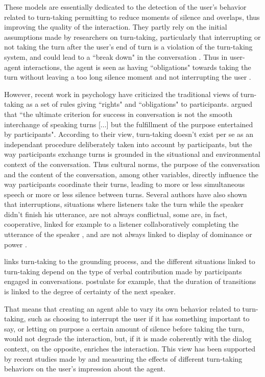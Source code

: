 These models are essentially dedicated to the detection of the user's behavior related to turn-taking permitting to reduce moments of silence and overlaps, thus improving the quality of the interaction. They partly rely on the initial assumptions made by researchers on turn-taking, particularly that interrupting or not taking the turn after the user's end of turn is a violation of the turn-taking system, and could lead to a ``break down" in the conversation \citep{cutler_analysis_1986}. Thus in user-agent interactions, the agent is seen as having ``obligations" towards taking the turn without leaving a too long silence moment and not interrupting the user \citep{de_kok_multimodal_2009}. 

However, recent work in psychology have criticized the traditional views of turn-taking as a set of rules giving ``rights" and ``obligations" to participants. \cite{oconnell_turn-taking_1990} argued that ``the ultimate criterion for success in conversation is not the smooth interchange of speaking turns [...] but the fulfillment of the purpose entertained by participants". According to their view, turn-taking doesn't exist per se as an independant procedure deliberately taken into account by participants, but the way participants exchange turns is grounded in the situational and environmental context of the conversation. Thus cultural norms, the purpose of the conversation and the content of the conversation, among other variables, directly influence the way participants coordinate their turns, leading to more or less simultaneous speech or more or less silence between turns. 
Several authors have also shown that interruptions, situations where listeners take the turn while the speaker didn't finish his utterance, are not always conflictual, some are, in fact, cooperative, linked for example to a listener collaboratively completing the utterance of the speaker \citep{clancy_co-constructed_2015}, and are not always linked to display of dominance or power \citep{goldberg_interrupting_1990}. 

\cite{clark_using_1996} links turn-taking to the grounding process, and the different situations linked to turn-taking depend on the type of verbal contribution made by participants engaged in conversations. \citep{clark_using_1996} postulate for example, that the duration of transitions is linked to the degree of certainty of the next speaker.

That means that creating an agent able to vary its own behavior related to turn-taking, such as choosing to interrupt the user if it has something important to say, or letting on purpose a certain amount of silence before taking the turn, would not degrade the interaction, but, if it is made coherently with the dialog context, on the opposite, enriches the interaction. 
This view has been supported by recent studies made by \citep{ter_maat_how_2010} and \citep{cafaro_effects_2016} measuring the effects of different turn-taking behaviors on the user's impression about the agent. 

